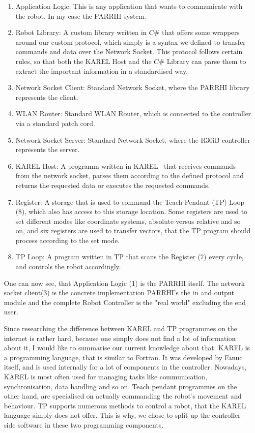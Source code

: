 \begin{enumerate}
	\item Application Logic: This is any application that wants to communicate with the robot. In my case the PARRHI system.
	\item Robot Library: A custom library written in $C\#$ that offers some wrappers around our custom protocol, which simply is a syntax we defined to transfer commands and data over the Network Socket. This protocol follows certain rules, so that both the KAREL Host and the $C\#$ Library can parse them to extract the important information in a standardised way.
	\item Network Socket Client: Standard Network Socket, where the PARRHI library represents the client.
	\item WLAN Router: Standard WLAN Router, which is connected to the controller via a standard patch cord.
	\item Network Socket Server: Standard Network Socket, where the R30iB controller represents the server.
	\item KAREL Host: A programm written in KAREL~\cite{FanucKarel} that receives commands from the network socket, parses them according to the defined protocol and returns the requested data or executes the requested commands.
	\item Register: A storage that is used to command the Teach Pendant (TP) Loop (8), which also has access to this storage location. Some registers are used to set different modes like coordinate systems, absolute versus relative and so on, and six registers are used to transfer vectors, that the TP program should process according to the set mode.
	\item TP Loop: A program written in TP that scans the Register (7) every cycle, and controls the robot accordingly.
\end{enumerate}

One can now see, that Application Logic (1) is the PARRHI itself. The network socket client(3) is the concrete implementation PARRHI's the in and output module and the complete Robot Controller is the "real world" excluding the end user.


Since researching the difference between KAREL and TP programmes on the internet is rather hard, because one simply does not find a lot of information about it, I would like to summarise our current knowledge about that. KAREL is a programming language, that is similar to Fortran. It was developed by Fanuc itself, and is used internally for a lot of components in the controller. Nowadays, KAREL is most often used for managing tasks like communication, synchronisation, data handling and so on. Teach pendant programmes on the other hand, are specialised on actually commanding the robot's movement and behaviour. TP supports numerous methods to control a robot, that the KAREL language simply does not offer. This is why, we chose to split up the controller-side software in these two programming components.


